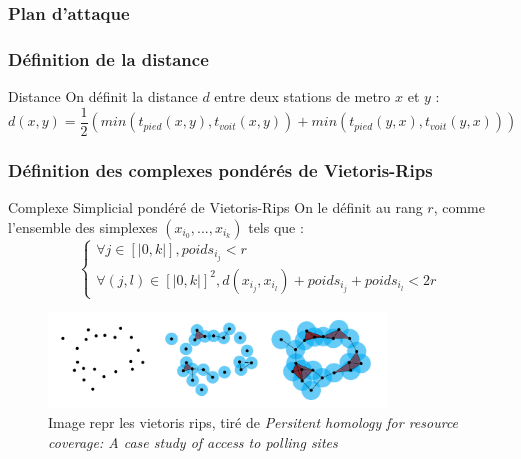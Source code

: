 \documentclass{beamer}
\begin{document}
\begin{frame}
    \frametitle{Plan d'attaque}

\end{frame}

\begin{frame}
    \frametitle{Définition de la distance}
    
    \begin{block}{Distance}
        On définit la distance $d$ entre deux stations de metro $x$ et $y$ : 
        $$ d(x,y) = \frac{1}{2}(min(t_{pied}(x,y), t_{voit}(x,y)) + min(t_{pied}(y,x), t_{voit}(y,x)))$$
    \end{block}
\end{frame}

\begin{frame}
    \frametitle{Définition des complexes pondérés de Vietoris-Rips}
    \begin{block}{Complexe Simplicial pondéré de Vietoris-Rips}
        On le définit au rang $r$, comme l'ensemble des simplexes $(x_{i_0}, ..., x_{i_k})$ tels que : 
        $$
            \begin{cases}
                \forall j \in [|0, k|], poids_{i_j} < r\\
                \forall (j,l) \in [|0, k|]^2, d(x_{i_j}, x_{i_l}) + poids_{i_j} + poids_{i_l} < 2r
            \end{cases}
        $$
    \end{block}

    \begin{figure}
        \includegraphics[width=0.8\textwidth]{../images/cech.png}
        \caption{Image repr les vietoris rips, tiré de \textit{Persitent homology for resource coverage: A case study of access to polling sites}}
    \end{figure}
    
\end{frame}
\end{document}
